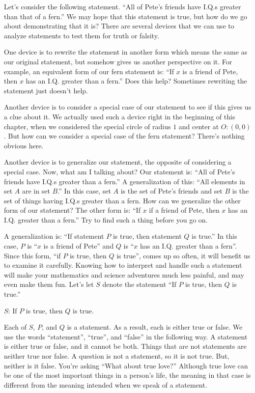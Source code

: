\documentclass[english]{book}
\begin{document}
Let's consider the following statement. ``All of Pete's friends have I.Q.s greater than that of a fern.'' We may hope that this statement is true, but how do we go about demonstrating that it is? There are several devices that we can use to analyze statements to test them for truth or falsity. 

One device is to rewrite the statement in another form which means the same as our original statement, but somehow gives us another perspective on it. For example, an equivalent form of our fern statement is: ``If $x$ is a friend of Pete, then $x$ has an I.Q. greater than a fern.'' Does this help? Sometimes rewriting the statement just doesn't help. 

Another device is to consider a special case of our statement to see if this gives us a clue about it. We actually used such a device right in the beginning of this chapter, when we considered the special circle of radius $1$ and center at $O:(0,0)$. But how can we consider a special case of the fern statement? There's nothing obvious here. 

Another device is to generalize our statement, the opposite of considering a special case. Now, what am I talking about? Our statement is: ``All of Pete's friends have I.Q.s greater than a fern.'' A generalization of this: ``All elements in set $A$ are in set $B$.'' In this case, set $A$ is the set of Pete's friends and set $B$ is the set of things having I.Q.s greater than a fern. How can we generalize the other form of our statement? The other form is: ``If $x$ if a friend of Pete, then $x$ has an I.Q. greater than a fern.'' Try to find such a thing before you go on.

A generalization is: ``If statement $P$ is true, then statement $Q$ is true.'' In this case, $P$ is ``$x$ is a friend of Pete'' and $Q$ is ``$x$ has an I.Q. greater than a fern''. Since this form, ``if $P$ is true, then $Q$ is true'', comes up so often, it will benefit us to examine it carefully. Knowing how to interpret and handle such a statement will make your mathematics and science adventures much less painful, and may even make them fun. Let's let $S$ denote the statement ``If $P$ is true, then $Q$ is true.'' 

$S$: If $P$ is true, then $Q$ is true. 

Each of $S$, $P$, and $Q$ is a statement. As a result, each is either true or false. We use the words ``statement'', ``true'', and ``false'' in the following way. A statement is either true or false, and it cannot be both. Things that are not statements are neither true nor false. A question is not a statement, so it is not true. But, neither is it false. You're asking ``What about true love?'' Although true love can be one of the most important things in a person's life, the meaning in that case is different from the meaning intended when we speak of a statement. 
\end{document}
